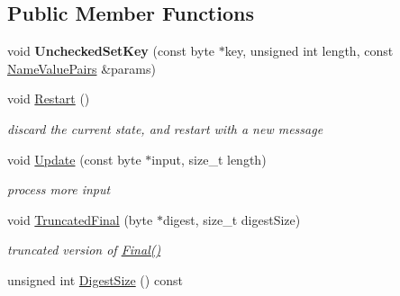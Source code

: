 \subsection*{Public Member Functions}
\begin{DoxyCompactItemize}
\item 
\hypertarget{class_hermetic_hash_function_m_a_c_aa56b083b2c191ec36bc9bf56df9bc346}{
void {\bfseries UncheckedSetKey} (const byte $\ast$key, unsigned int length, const \hyperlink{class_name_value_pairs}{NameValuePairs} \&params)}
\label{class_hermetic_hash_function_m_a_c_aa56b083b2c191ec36bc9bf56df9bc346}

\item 
\hypertarget{class_hermetic_hash_function_m_a_c_a7d2ca6328f5d859a3dcec39240aa700f}{
void \hyperlink{class_hermetic_hash_function_m_a_c_a7d2ca6328f5d859a3dcec39240aa700f}{Restart} ()}
\label{class_hermetic_hash_function_m_a_c_a7d2ca6328f5d859a3dcec39240aa700f}

\begin{DoxyCompactList}\small\item\em discard the current state, and restart with a new message \item\end{DoxyCompactList}\item 
\hypertarget{class_hermetic_hash_function_m_a_c_ad724a2082e81c4174fdd877030ead35b}{
void \hyperlink{class_hermetic_hash_function_m_a_c_ad724a2082e81c4174fdd877030ead35b}{Update} (const byte $\ast$input, size\_\-t length)}
\label{class_hermetic_hash_function_m_a_c_ad724a2082e81c4174fdd877030ead35b}

\begin{DoxyCompactList}\small\item\em process more input \item\end{DoxyCompactList}\item 
\hypertarget{class_hermetic_hash_function_m_a_c_ae7fb80814d9ed73148a63a9f33890422}{
void \hyperlink{class_hermetic_hash_function_m_a_c_ae7fb80814d9ed73148a63a9f33890422}{TruncatedFinal} (byte $\ast$digest, size\_\-t digestSize)}
\label{class_hermetic_hash_function_m_a_c_ae7fb80814d9ed73148a63a9f33890422}

\begin{DoxyCompactList}\small\item\em truncated version of \hyperlink{class_hash_transformation_aa0b8c7a110d8968268fd02ec32b9a8e8}{Final()} \item\end{DoxyCompactList}\item 
\hypertarget{class_hermetic_hash_function_m_a_c_ab6797b4705656e5ca0dcf1e750d3daca}{
unsigned int \hyperlink{class_hermetic_hash_function_m_a_c_ab6797b4705656e5ca0dcf1e750d3daca}{DigestSize} () const }
\label{class_hermetic_hash_function_m_a_c_ab6797b4705656e5ca0dcf1e750d3daca}


\end{DoxyCompactItemize}
